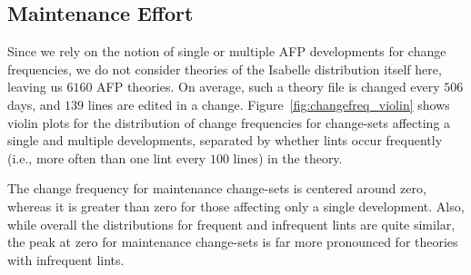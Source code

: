 \subsection{Maintenance Effort}
Since we rely on the notion of single or multiple AFP developments for change frequencies,
we do not consider theories of the Isabelle distribution itself here,
leaving us $6160$ AFP theories.
On average, such a theory file is changed every $506$ days, and $139$ lines are edited in a change.
Figure~\ref{fig:changefreq_violin} shows violin plots for the distribution of change frequencies for change-sets affecting a single and multiple developments,
separated by whether lints occur frequently (i.e., more often than one lint every $100$ lines) in the theory.

The change frequency for maintenance change-sets is centered around zero,
whereas it is greater than zero for those affecting only a single development.
Also, while overall the distributions for frequent and infrequent lints are quite similar,
the peak at zero for maintenance change-sets is far more pronounced for theories with infrequent lints.

